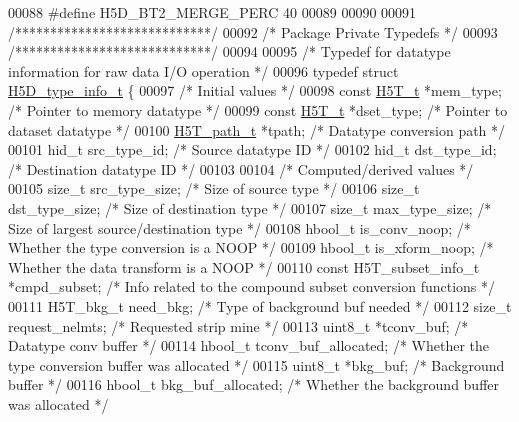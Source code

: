 \begin{DoxyCode}
00088 \textcolor{preprocessor}{#define H5D\_BT2\_MERGE\_PERC          40}
00089 
00090 
00091 \textcolor{comment}{/****************************/}
00092 \textcolor{comment}{/* Package Private Typedefs */}
00093 \textcolor{comment}{/****************************/}
00094 
00095 \textcolor{comment}{/* Typedef for datatype information for raw data I/O operation */}
00096 \textcolor{keyword}{typedef} \textcolor{keyword}{struct }\hyperlink{struct_h5_d__type__info__t}{H5D\_type\_info\_t} \{
00097     \textcolor{comment}{/* Initial values */}
00098     \textcolor{keyword}{const} \hyperlink{struct_h5_t__t}{H5T\_t} *mem\_type;              \textcolor{comment}{/* Pointer to memory datatype */}
00099     \textcolor{keyword}{const} \hyperlink{struct_h5_t__t}{H5T\_t} *dset\_type;             \textcolor{comment}{/* Pointer to dataset datatype */}
00100     \hyperlink{struct_h5_t__path__t}{H5T\_path\_t} *tpath;                  \textcolor{comment}{/* Datatype conversion path */}
00101     hid\_t src\_type\_id;                  \textcolor{comment}{/* Source datatype ID */}
00102     hid\_t dst\_type\_id;                  \textcolor{comment}{/* Destination datatype ID */}
00103 
00104     \textcolor{comment}{/* Computed/derived values */}
00105     \textcolor{keywordtype}{size\_t} src\_type\_size;       \textcolor{comment}{/* Size of source type  */}
00106     \textcolor{keywordtype}{size\_t} dst\_type\_size;           \textcolor{comment}{/* Size of destination type */}
00107     \textcolor{keywordtype}{size\_t} max\_type\_size;           \textcolor{comment}{/* Size of largest source/destination type */}
00108     hbool\_t is\_conv\_noop;               \textcolor{comment}{/* Whether the type conversion is a NOOP */}
00109     hbool\_t is\_xform\_noop;              \textcolor{comment}{/* Whether the data transform is a NOOP */}
00110     \textcolor{keyword}{const} H5T\_subset\_info\_t *cmpd\_subset;   \textcolor{comment}{/* Info related to the compound subset conversion functions */}
00111     H5T\_bkg\_t need\_bkg;             \textcolor{comment}{/* Type of background buf needed */}
00112     \textcolor{keywordtype}{size\_t} request\_nelmts;      \textcolor{comment}{/* Requested strip mine */}
00113     uint8\_t *tconv\_buf;                 \textcolor{comment}{/* Datatype conv buffer */}
00114     hbool\_t tconv\_buf\_allocated;        \textcolor{comment}{/* Whether the type conversion buffer was allocated */}
00115     uint8\_t *bkg\_buf;                   \textcolor{comment}{/* Background buffer    */}
00116     hbool\_t bkg\_buf\_allocated;          \textcolor{comment}{/* Whether the background buffer was allocated */}

\end{DoxyCode}
